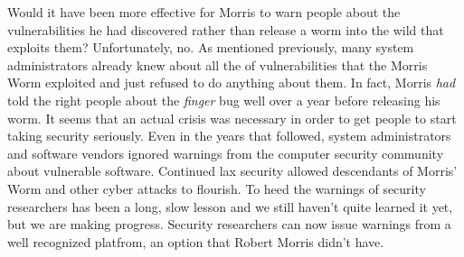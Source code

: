 Would it have been more effective for Morris to warn people about the
vulnerabilities he had discovered rather than release a worm into the wild that
exploits them? Unfortunately, no. As mentioned previously, many system
administrators already knew about all the of vulnerabilities that the Morris
Worm exploited and just refused to do anything about them. In fact, Morris
\textit{had} told the right people about the \textit{finger} bug well over a
year before releasing his worm. It seems that an actual crisis was necessary in
order to get people to start taking security seriously. Even in the years that
followed, system administrators and software vendors ignored warnings from the
computer security community about vulnerable software. Continued lax security
allowed descendants of Morris' Worm and other cyber attacks to flourish. To heed the
warnings of security researchers has been a long, slow lesson and 
we still haven't quite learned it yet, but we are making progress. Security
researchers can now issue warnings from a well recognized platfrom, an option
that Robert Morris didn't have.
